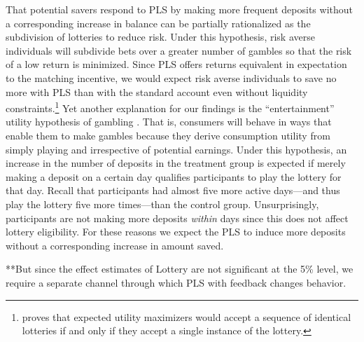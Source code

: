 \documentclass[11pt]{article}
\begin{document}
		That potential savers respond to PLS by making more frequent deposits without a corresponding increase in balance can be partially rationalized as the subdivision of lotteries to reduce risk. Under this hypothesis, risk averse individuals will subdivide bets over a greater number of gambles so that the risk of a low return is minimized. Since PLS offers returns equivalent in expectation to the matching incentive, we would expect risk averse individuals to save no more with PLS than with the standard account even without liquidity constraints.\footnote{\textcite{samuelson_risk_1963} proves that expected utility maximizers would accept a sequence of identical lotteries if and only if they accept a single instance of the lottery.} Yet another explanation for our findings is the ``entertainment'' utility hypothesis of gambling \parencite{conlisk_utility_1993}. That is, consumers will behave in ways that enable them to make gambles because they derive consumption utility from simply playing and irrespective of potential earnings. Under this hypothesis, an increase in the number of deposits in the treatment group is expected if merely making a deposit on a certain day qualifies participants to play the lottery for that day. Recall that participants had almost five more active days---and thus play the lottery five more times---than the control group. Unsurprisingly, participants are not making more deposits \textit{within} days since this does not affect lottery eligibility. For these reasons we expect the PLS to induce more deposits without a corresponding increase in amount saved. 

		**But since the effect estimates of Lottery are not significant at the 5\% level, we require a separate channel through which PLS with feedback changes behavior.




\end{document}

